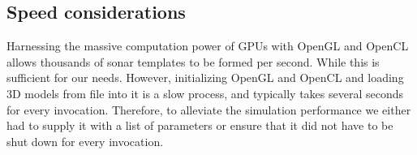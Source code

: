 \subsection{Speed considerations}

Harnessing the massive computation power of GPUs with OpenGL and OpenCL allows thousands of sonar templates to be formed per second. While this is sufficient for our needs. However, initializing OpenGL and OpenCL and loading 3D models from file into it is a slow process, and typically takes several seconds for every invocation. Therefore, to alleviate the simulation performance we either had to supply it with a list of parameters or ensure that it did not have to be shut down for every invocation. 



